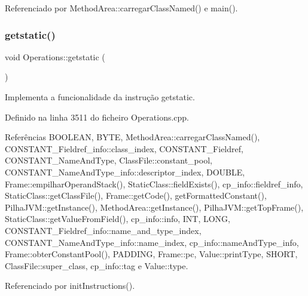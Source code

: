 Referenciado por Method\+Area\+::carregar\+Class\+Named() e main().

\mbox{\label{classOperations_a0514422a81aa3efa5cb8b3bd1a505a68}} 
\subsubsection{\texorpdfstring{getstatic()}{getstatic()}}
{\footnotesize\ttfamily void Operations\+::getstatic (\begin{DoxyParamCaption}{ }\end{DoxyParamCaption})\hspace{0.3cm}{\ttfamily [private]}}



Implementa a funcionalidade da instrução getstatic. 



Definido na linha 3511 do ficheiro Operations.\+cpp.



Referências B\+O\+O\+L\+E\+AN, B\+Y\+TE, Method\+Area\+::carregar\+Class\+Named(), C\+O\+N\+S\+T\+A\+N\+T\+\_\+\+Fieldref\+\_\+info\+::class\+\_\+index, C\+O\+N\+S\+T\+A\+N\+T\+\_\+\+Fieldref, C\+O\+N\+S\+T\+A\+N\+T\+\_\+\+Name\+And\+Type, Class\+File\+::constant\+\_\+pool, C\+O\+N\+S\+T\+A\+N\+T\+\_\+\+Name\+And\+Type\+\_\+info\+::descriptor\+\_\+index, D\+O\+U\+B\+LE, Frame\+::empilhar\+Operand\+Stack(), Static\+Class\+::field\+Exists(), cp\+\_\+info\+::fieldref\+\_\+info, Static\+Class\+::get\+Class\+File(), Frame\+::get\+Code(), get\+Formatted\+Constant(), Pilha\+J\+V\+M\+::get\+Instance(), Method\+Area\+::get\+Instance(), Pilha\+J\+V\+M\+::get\+Top\+Frame(), Static\+Class\+::get\+Value\+From\+Field(), cp\+\_\+info\+::info, I\+NT, L\+O\+NG, C\+O\+N\+S\+T\+A\+N\+T\+\_\+\+Fieldref\+\_\+info\+::name\+\_\+and\+\_\+type\+\_\+index, C\+O\+N\+S\+T\+A\+N\+T\+\_\+\+Name\+And\+Type\+\_\+info\+::name\+\_\+index, cp\+\_\+info\+::name\+And\+Type\+\_\+info, Frame\+::obter\+Constant\+Pool(), P\+A\+D\+D\+I\+NG, Frame\+::pc, Value\+::print\+Type, S\+H\+O\+RT, Class\+File\+::super\+\_\+class, cp\+\_\+info\+::tag e Value\+::type.



Referenciado por init\+Instructions().

